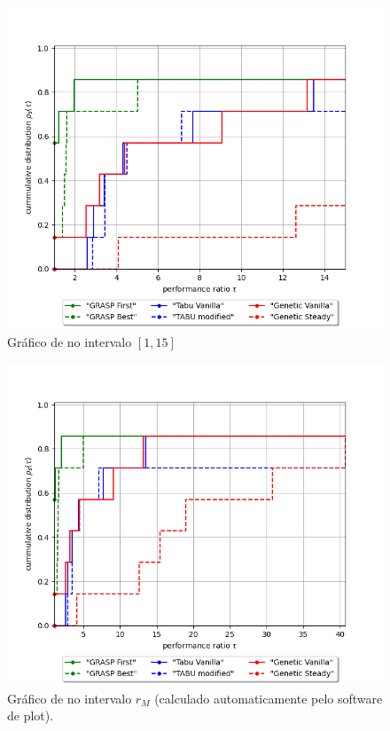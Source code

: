 \begin{figure}[H]
    \centering
    \includegraphics[width=\textwidth]{figure/performance_profile/performance_profile_thmax_15.0.png}
    \caption{Gráfico de \perfprof no intervalo $[1, 15]$}
    \label{fig:performance-profile-15}
\end{figure}

\begin{figure}[H]
    \centering
    \includegraphics[width=\textwidth]{figure/performance_profile/performance_profile_thmax_None.png}
    \caption{Gráfico de \perfprof no intervalo $r_M$ (calculado automaticamente pelo software de plot).}
    \label{fig:performance-profile-max}
\end{figure}
